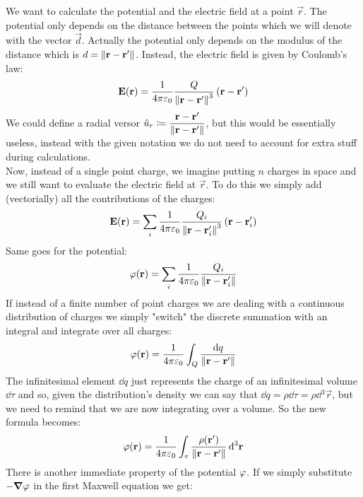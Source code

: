 We want to calculate the potential and the electric field at a point $\vec{r}$. The potential only depends on the distance between the points which we will denote with the vector $\vec{d}$. Actually the potential only depends on the modulus of the distance which is $d = \norm{\vb{r}-\vb{r}'}$. Instead, the electric field is given by Coulomb's law:
\begin{equation}
  \vb{E}(\vb{r}) = \dfrac{1}{4 \pi \varepsilon_0}\dfrac{Q}{\norm{\vb{r}-\vb{r}'}^3}\left(\vb{r}-\vb{r}'\right)
\end{equation}
We could define a radial versor $\hat{u}_r \coloneqq \dfrac{\vb{r}-\vb{r}'}{\norm{\vb{r}-\vb{r}'}}$, but this would be essentially useless, instead with the given notation we do not need to account for extra stuff during calculations.\\
Now, instead of a single point charge, we imagine putting $n$ charges in space and we still want to evaluate the electric field at $\vec{r}$. To do this we simply add (vectorially) all the contributions of the charges:
\begin{equation}
  \vb{E}(\vb{r}) = \displaystyle\sum_i\dfrac{1}{4 \pi \varepsilon_0}\dfrac{Q_i}{\norm{\vb{r}-\vb{r}_i'}^3}\left(\vb{r}-\vb{r}_i'\right)
\end{equation}
Same goes for the potential:
\begin{equation}
  \varphi(\vb{r}) = \displaystyle\sum_i\dfrac{1}{4 \pi \varepsilon_0}\dfrac{Q_i}{\norm{\vb{r}-\vb{r}_i'}}
\end{equation}
If instead of a finite number of point charges we are dealing with a continuous distribution of charges we simply "switch" the discrete summation with an integral and integrate over all charges:
\begin{equation}
  \varphi(\vb{r}) = \dfrac{1}{4 \pi \varepsilon_0}\int_Q \dfrac{\dd{q}}{\norm{\vb{r}-\vb{r}'}}
\end{equation}
The infinitesimal element $\dd{q}$ just represents the charge of an infinitesimal volume $\dd{\tau}$ and so, given the distribution's density we can say that $\dd{q} = \rho \dd{\tau} = \rho \dd{^3 \vec{r}}$, but we need to remind that we are now integrating over a volume. So the new formula becomes:
\begin{equation} \label{e:general_sol_poisson}
  \varphi(\vb{r}) = \dfrac{1}{4 \pi \varepsilon_0}\int_{\tau} \dfrac{\rho (\vb{r}')}{\norm{\vb{r}-\vb{r}'}}\dd{^3 \vb{r}}
\end{equation}
There is another immediate property of the potential $\varphi$. If we simply substitute $-\grad{\varphi}$ in the first Maxwell equation we get:
